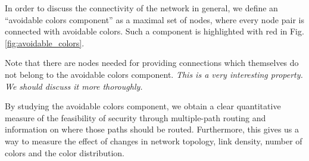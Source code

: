 \documentclass[aps, pre, twocolumn, a4paper, floatfix]{revtex4}
\newcommand{\red}{\color{red}}
\begin{document}
In order to discuss the connectivity of the network in general, 
we define an ``avoidable colors component'' as a maximal set of nodes, 
where every node pair is connected with avoidable colors. 
Such a component is highlighted with red in Fig. \ref{fig:avoidable_colors}. 

{\red 
Note that there are nodes needed for providing 
connections which themselves do not belong to the avoidable colors component. 
\textit{This is a very interesting property. We should discuss it more thoroughly.}}

By studying the avoidable colors component, we obtain a clear quantitative measure of the feasibility of security through multiple-path routing and information on where those paths should be routed.
Furthermore, this gives us a way to measure the effect of changes in network topology, link density, number of colors and the color distribution.

\end{document}
